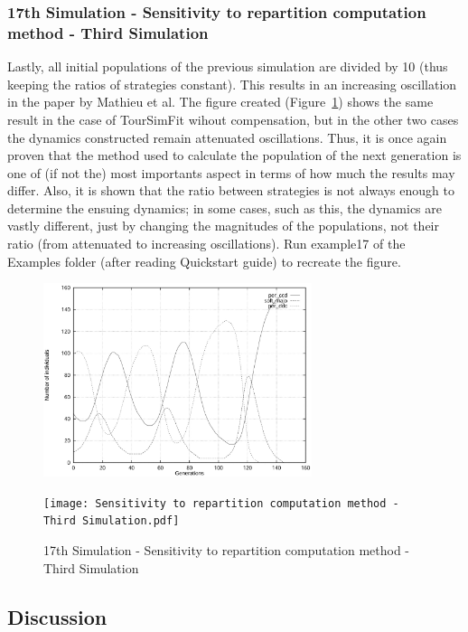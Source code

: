 \subsubsection{17th Simulation - Sensitivity to repartition computation method - Third Simulation}
Lastly, all initial populations of the previous simulation are divided by 10 (thus keeping the ratios of strategies constant). This results in an increasing oscillation in the paper by Mathieu et al. The figure created (Figure~\ref{fig:Sensitivity to repartition computation method - Third Simulation}) shows the same result in the case of TourSimFit wihout compensation, but in the other two cases the dynamics constructed remain attenuated oscillations. Thus, it is once again proven that the method used to calculate the population of the next generation is one of (if not the) most importants aspect in terms of how much the results may differ. Also, it is shown that the ratio between strategies is not always enough to determine the ensuing dynamics; in some cases, such as this, the dynamics are vastly different, just by changing the magnitudes of the populations, not their ratio (from attenuated to increasing oscillations). Run example17 of the Examples folder (after reading Quickstart guide) to recreate the figure.
	\begin{figure}[h]
	    \centering
		\includegraphics[width=0.7\textwidth]{RefPaperFigures/fig12b.jpeg}\par\vspace{0.5em}
	    \texttt{[image: Sensitivity to repartition computation method - Third Simulation.pdf]}
	    \caption{17th Simulation - Sensitivity to repartition computation method - Third Simulation}
	    \label{fig:Sensitivity to repartition computation method - Third Simulation}
	\end{figure}
\subsection{Discussion}

